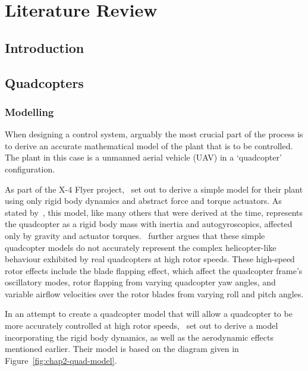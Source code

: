\chapter{Literature Review}
\label{chap:lit-review}

\section{Introduction}

\section{Quadcopters}

\subsection{Modelling}

When designing a control system, arguably the most crucial part of the process is to derive an accurate mathematical model of the plant that is to be controlled. The plant in this case is a unmanned aerial vehicle (UAV) in a `quadcopter' configuration. 

As part of the X-4 Flyer project,~\cite{hamel2002dynamic} set out to derive a simple model for their plant using only rigid body dynamics and abstract force and torque actuators. As stated by~\cite{Pounds2010c}, this model, like many others that were derived at the time, represents the quadcopter as a rigid body mass with inertia and autogyroscopics, affected only by gravity and actuator torques.~\citeauthor{Pounds2010c} further argues that these simple quadcopter models do not accurately represent the complex helicopter-like behaviour exhibited by real quadcopters at high rotor speeds. These high-speed rotor effects include the blade flapping effect, which affect the quadcopter frame's oscillatory modes, rotor flapping from varying quadcopter yaw angles, and variable airflow velocities over the rotor blades from varying roll and pitch angles.

In an attempt to create a quadcopter model that will allow a quadcopter to be more accurately controlled at high rotor speeds,~\citeauthor{Pounds2010c} set out to derive a model incorporating the rigid body dynamics, as well as the aerodynamic effects mentioned earlier. Their model is based on the diagram given in Figure~\ref{fig:chap2-quad-model}.

